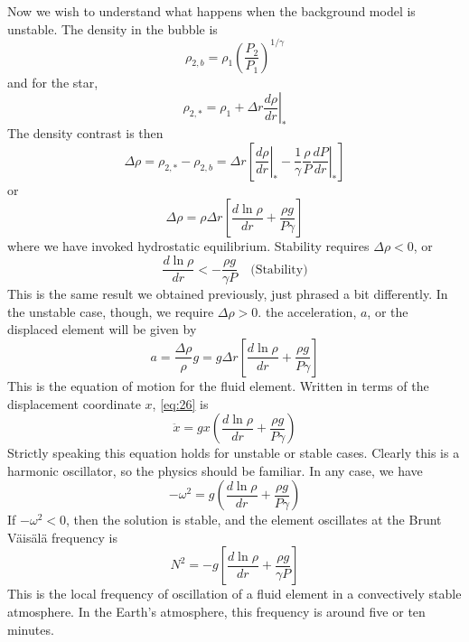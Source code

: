 \documentclass[10pt]{article}
\numberwithin{equation}{section}
\begin{document}
Now we wish to understand what happens when the background model is
unstable. The density in the bubble is
\begin{equation}
  \label{eq:21}
  \rho_{2,b}=\rho_1\left(\frac{P_2}{P_1}\right)^{1/\gamma}
\end{equation}
and for the star,
\begin{equation}
  \label{eq:22}
  \rho_{2,*}=\rho_1+\left.\Delta r\frac{d\rho}{dr}\right|_*
\end{equation}
The density contrast is then
\begin{equation}
  \label{eq:23}
  \Delta \rho=\rho_{2,*}-\rho_{2,b}=\Delta r\left[\left.\frac{d\rho}{dr}\right|_*-\frac{1}{\gamma}\frac{\rho}{P}\left.\frac{dP}{dr}\right|_*\right]
\end{equation}
or
\begin{equation}
  \label{eq:24}
  \Delta\rho=\rho\Delta r\left[\frac{d\ln\rho}{dr}+\frac{\rho g}{P\gamma}\right]
\end{equation}
where we have invoked hydrostatic equilibrium. Stability requires
$\Delta\rho<0$, or
\begin{equation}
  \label{eq:25}
  \boxed{\frac{d\ln\rho}{dr}<-\frac{\rho g}{\gamma P}\quad\textrm{(Stability)}}
\end{equation}
This is the same result we obtained previously, just phrased a bit
differently. In the unstable case, though, we require $\Delta\rho>0$. the
acceleration, $a$, or the displaced element will be given by 
\begin{equation}
  \label{eq:26}
  a=\frac{\Delta\rho}{\rho}g=g\Delta
  r\left[\frac{d\ln\rho}{dr}+\frac{\rho g}{P\gamma}\right]
\end{equation}
This is the equation of motion for the fluid element. Written in
terms of the displacement coordinate $x$, \eqref{eq:26} is
\begin{equation}
  \label{eq:27}
  \ddot{x}=gx\left(\frac{d\ln\rho}{dr}+\frac{\rho g}{P\gamma}\right)
\end{equation}
Strictly speaking this equation holds for unstable or stable
cases. Clearly this is a harmonic oscillator, so the physics should be
familiar. In any case, we have
\begin{equation}
  \label{eq:28}
  -\omega^2=g\left(\frac{d\ln\rho}{dr}+\frac{\rho g}{P \gamma}\right)
\end{equation}
If $-\omega^2<0$, then the solution is stable, and the element
oscillates at the Brunt V\"{a}is\"{a}l\"{a} frequency is 
\begin{equation}
  \label{eq:29}
  N^2=-g\left[\frac{d\ln\rho}{dr}+\frac{\rho g}{\gamma P}\right]
\end{equation}
This is the local frequency of oscillation of a fluid element in a
convectively stable atmosphere. In the Earth's atmosphere, this
frequency is around five or ten minutes.\\
\end{document}
